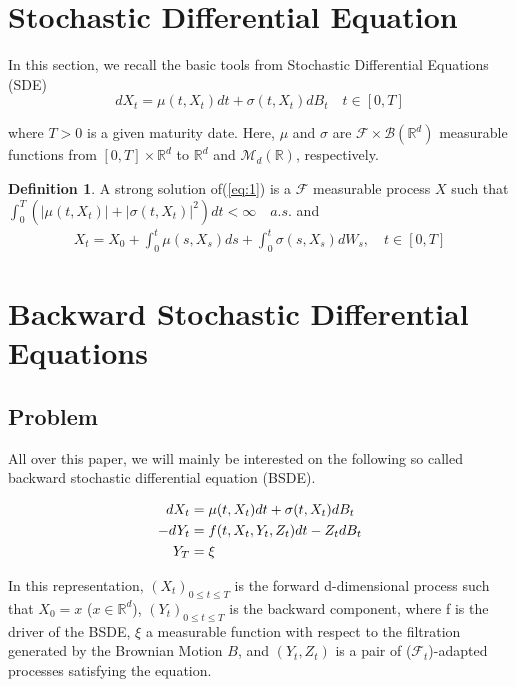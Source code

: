 \documentclass[english,11pt,openany]{report}
\theoremstyle{definition}
\newtheorem{defn}{Definition}[section]
\newcommand{\R}{\mathbb{R}}
\theoremstyle{plain}
\theoremstyle{definition}
\begin{document}
\section{Stochastic Differential Equation}

In this section, we recall the basic tools from Stochastic Differential Equations (SDE) 
\begin{equation}
dX_t = \mu(t,X_t)dt + \sigma (t, X_t) dB_t \quad t\in [0,T] \label{eq:1}
\end{equation}

where $T >0$ is a given maturity date.  Here,  $\mu$ and $\sigma$ are $\mathcal{F}\times \mathcal{B}(\R^d)$ measurable functions from $[0,T] \times \R^d$ to $\R^d$ and $\mathcal{M}_d(\R)$,  respectively. 

\begin{defn}
A strong  solution  of(\ref{eq:1}) is  a $\mathcal{F}$ measurable process $X$ such 
that $\int_{0}^{T}(|\mu(t, X_t)|+|\sigma(t, X_t)|^2)dt < \infty \quad a.s.$  and 
\begin{eqnarray}
X_t = X_0 + \int_{0}^{t}\mu(s, X_s)ds + \int_{0}^{t}\sigma(s, X_s)dW_s, \quad t \in [0,T] \label{eq:2}
\end{eqnarray}
	
\end{defn}


\section{Backward Stochastic Differential Equations}

\subsection{Problem}

All over this paper, we will mainly be interested on the following so called backward stochastic differential equation (BSDE). 

\begin{align}\label{eq:bsde}
dX_t &= \mu(t,X_t)dt + \sigma (t, X_t) dB_t \notag\\
-dY_t &= f(t,X_t, Y_t, Z_t)dt - Z_tdB_t  \notag\\
Y_T& =\xi
\end{align}

In this representation, $(X_t)_{0 \leq t \leq T}$ is the forward d-dimensional process such that $X_0 = x$ ($x \in \R^d$),  
$(Y_t)_{0 \leq t \leq T}$ is the backward component, where f is the driver of the BSDE, $\xi$ a measurable function with respect to the filtration generated by the Brownian Motion $B$, and $(Y_t, Z_t)$ is a pair of ($\mathcal{F}_t$)-adapted processes satisfying the equation. 
\end{document}
